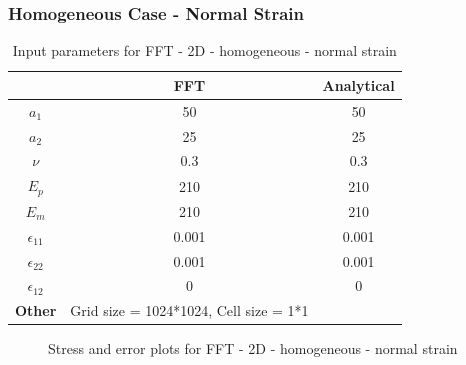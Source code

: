 \documentclass[12pt, a4paper]{report}
\begin{document}
\subsubsection{Homogeneous Case - Normal Strain}
\begin{table}[H]
    \centering
    \begin{tabular}{|c|c|c|}
        \hline
        & \textbf{FFT} &\textbf{Analytical}\\
        \hline
        \textbf{$a_1$} & 50 & 50 \\
        \hline
        \textbf{$a_2$} & 25 & 25 \\
        \hline
        \textbf{$\nu$} & 0.3 & 0.3 \\
        \hline
        \textbf{$E_p$} & 210 & 210 \\
        \hline
        \textbf{$E_m$} & 210 & 210 \\
        \hline
        \textbf{$\epsilon_{11}$} & 0.001 & 0.001 \\
        \hline
        \textbf{$\epsilon_{22}$} & 0.001 & 0.001 \\
        \hline
        \textbf{$\epsilon_{12}$} & 0 & 0 \\
        \hline
        \textbf{Other} & Grid size = 1024*1024, Cell size = 1*1 &  \\
        \hline
    \end{tabular}
    \caption{Input parameters for FFT - 2D - homogeneous - normal strain}
\end{table}

\begin{figure}[htbp]
  \centering
  \hfill
  \caption{Stress and error plots for FFT - 2D - homogeneous - normal strain}
\end{figure}
\end{document}
